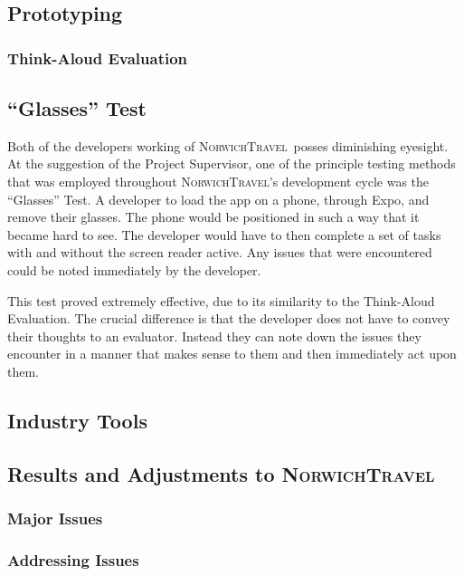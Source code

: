 \documentclass[cmpstyle]{ueacmpstyle}
\newcommand{\nt}{\textsc{NorwichTravel}}
\begin{document}
		\subsection{Prototyping} \label{sec:proto}
		
			\subsubsection{Think-Aloud Evaluation} \label{sec:think}
			
		\subsection{``Glasses'' Test} \label{sec:glasses}
		Both of the developers working of \nt \ posses diminishing eyesight. At the suggestion of the Project Supervisor, one of the principle testing methods that was employed throughout \nt's development cycle was the ``Glasses'' Test. A developer to load the app on a phone, through Expo, and remove their glasses. The phone would be positioned in such a way that it became hard to see. The developer would have to then complete a set of tasks with and without the screen reader active. Any issues that were encountered could be noted immediately by the developer. 
		
		This test proved extremely effective, due to its similarity to the Think-Aloud Evaluation. The crucial difference is that the developer does not have to convey their thoughts to an evaluator. Instead they can note down the issues they encounter in a manner that makes sense to them and then immediately act upon them. 
		
		\subsection{Industry Tools} \label{sec:industry-tools}
		
		\subsection{Results and Adjustments to \nt} \label{sec:adjust}
			
			\subsubsection{Major Issues} \label{sec:major}
			
			\subsubsection{Addressing Issues} \label{sec:address}
			
\end{document}
